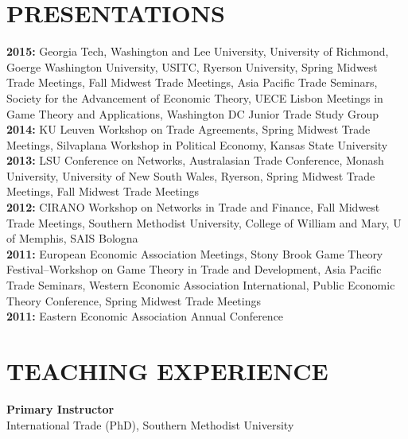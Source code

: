 \documentclass[11pt]{res}
\begin{document}
\begin{resume}
\section{PRESENTATIONS}\vspace{1.5mm}
{\bf 2015:} Georgia Tech, Washington and Lee University, University of Richmond, Goerge Washington University, USITC, Ryerson University, Spring Midwest Trade Meetings, Fall Midwest Trade Meetings, Asia Pacific Trade Seminars, Society for the Advancement of Economic Theory, UECE Lisbon Meetings in Game Theory and Applications, Washington DC Junior Trade Study Group\vspace{1.5mm}\\
{\bf 2014:} KU Leuven Workshop on Trade Agreements, Spring Midwest Trade Meetings, Silvaplana Workshop in Political Economy, Kansas State University\vspace{1.5mm}\\
{\bf 2013:} LSU Conference on Networks, Australasian Trade Conference, Monash University, University of New South Wales, Ryerson, Spring Midwest Trade Meetings, Fall Midwest Trade Meetings\vspace{1.5mm}\\
{\bf 2012:}  CIRANO Workshop on Networks in Trade and Finance, Fall Midwest Trade Meetings, Southern Methodist University, College of William and Mary, U of Memphis, SAIS Bologna\vspace{1.5mm}\\
{\bf 2011:} European Economic Association Meetings, Stony Brook Game Theory Festival--Workshop on Game Theory in Trade and Development, Asia Pacific Trade Seminars, Western Economic Association International, Public Economic Theory Conference, Spring Midwest Trade Meetings\vspace{1.5mm}\\
{\bf 2011:} Eastern Economic Association Annual Conference \vspace{1.5mm}\\

\section{TEACHING EXPERIENCE} \vspace{1.5mm}
{\bf Primary Instructor}\vspace{1.5mm}\\
International Trade (PhD), Southern Methodist University\vspace{1.5mm}\\


\end{resume}
\end{document}
